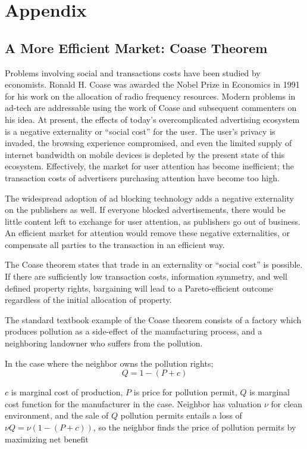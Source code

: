 \documentclass[11pt]{article}
\begin{document}
\section{Appendix}
\label{sec-8}
\subsection{A More Efficient Market: Coase Theorem}
\label{sec-8-1}

Problems involving social and transactions costs have been studied by
economists. Ronald H. Coase was awarded the Nobel Prize in Economics
in 1991 for his work on the allocation of radio frequency resources.\cite{19}
Modern problems in ad-tech are addressable using the work of Coase and
subsequent commenters on his idea. At present, the effects of today's
overcomplicated advertising ecosystem is a negative externality or
``social cost'' for the user. The user's privacy is invaded, the
browsing experience compromised, and even the limited supply of
internet bandwidth on mobile devices is depleted by the present state
of this ecosystem. Effectively, the market for user attention has
become inefficient; the transaction costs of advertisers purchasing
attention have become too high. 

The widespread adoption of ad blocking technology adds a negative
externality on the publishers as well. If everyone blocked
advertisements, there would be little content left to exchange for
user attention, as publishers go out of business. An efficient market
for attention would remove these negative externalities, or compensate
all parties to the transaction in an efficient way. 

The Coase theorem states that trade in an externality or ``social cost''
is possible. If there are sufficiently low transaction costs,
information symmetry, and well defined property rights, bargaining
will lead to a Pareto-efficient outcome regardless of the initial
allocation of property. 

The standard textbook example of the Coase theorem consists of a
factory which produces pollution as a side-effect of the manufacturing
process, and a neighboring landowner who suffers from the pollution. 

In the case where the neighbor owns the pollution rights;
  \[ Q= 1-(P + c) \]

$c$ is marginal cost of production, $P$ is price for pollution permit, $Q$ is marginal cost 
function for the manufacturer in the case. Neighbor has valuation $ \nu $ for clean environment,  and the sale of $Q$ pollution permits entails a loss of $ \nu Q = \nu(1-(P+c))$, so the neighbor finds the price of pollution permits by maximizing net benefit 
\end{document}
